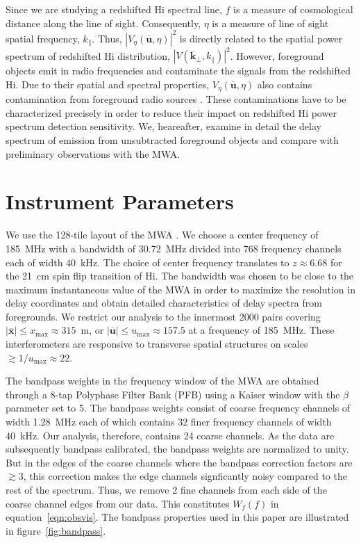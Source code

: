 \documentclass[preprint2,iop,numberedappendix]{emulateapj}
\begin{document}
Since we are studying a redshifted H{\sc i} spectral line, $f$ is a measure of cosmological distance along the line of sight. Consequently, $\eta$ is a measure of line of sight spatial frequency, $k_\parallel$. Thus, $|V_\eta(\overline{\mathbf{u}},\eta)|^2$ is directly related to the spatial power spectrum of redshifted H{\sc i} distribution, $|V(\overline{\mathbf{k}}_\perp,k_\parallel)|^2$. However, foreground objects emit in radio frequencies and contaminate the signals from the redshifted H{\sc i}. Due to their spatial and spectral properties, $V_\eta(\overline{\mathbf{u}},\eta)$ also contains contamination from foreground radio sources \citep{thy13,tro12,mor12,bow09}. These contaminations have to be characterized precisely in order to reduce their impact on redshifted H{\sc i} power spectrum detection sensitivity. We, heareafter, examine in detail the delay spectrum of emission from unsubtracted foreground objects and compare with preliminary observations with the MWA.

\section{Instrument Parameters}\label{sec:instrument}

We use the 128-tile layout of the MWA \citep{bea12}. We choose a center frequency of 185~MHz with a bandwidth of 30.72~MHz divided into 768 frequency channels each of width 40~kHz. The choice of center frequency translates to $z\approx 6.68$ for the 21~cm spin flip transition of H{\sc i}. The bandwidth was chosen to be close to the maximum instantaneous value of the MWA in order to maximize the resolution in delay coordinates and obtain detailed characteristics of delay spectra from foregrounds. We restrict our analysis to the innermost 2000 pairs covering $|\overline{\mathbf{x}}| \leq x_\textrm{max} \approx 315$~m, or $|\overline{\mathbf{u}}| \leq u_\textrm{max} \approx 157.5$ at a frequency of 185~MHz. These interferometers are responsive to transverse spatial structures on scales $\gtrsim 1/u_\textrm{max} \approx 22$\arcmin. 

The bandpass weights in the frequency window of the MWA are obtained through a 8-tap Polyphase Filter Bank (PFB) using a Kaiser window with the $\beta$ parameter set to 5. The bandpass weights consist of coarse frequency channels of width 1.28~MHz each of which contains 32 finer frequency channels of width 40~kHz. Our analysis, therefore, contains 24 coarse channels. As the data are subsequently bandpass calibrated, the bandpass weights are normalized to unity. But in the edges of the coarse channels where the bandpass correction factors are $\gtrsim 3$, this correction makes the edge channels signficantly noisy compared to the rest of the spectrum. Thus, we remove 2 fine channels from each side of the coarse channel edges from our data. This constitutes $W_f(f)$ in equation~\ref{eqn:obsvis}. The bandpass properties used in this paper are illustrated in figure~\ref{fig:bandpass}. 
\end{document}
